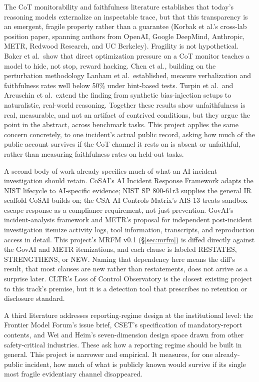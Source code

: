 \documentclass[10pt]{article}
\begin{document}
The CoT monitorability and faithfulness literature establishes that today's
reasoning models externalize an inspectable trace, but that this
transparency is an emergent, fragile property rather than a guarantee
(Korbak et al.'s cross-lab position paper, spanning authors from OpenAI,
Google DeepMind, Anthropic, METR, Redwood Research, and UC Berkeley).
Fragility is not hypothetical. Baker et al.\ show that direct optimization
pressure on a CoT monitor teaches a model to hide, not stop, reward hacking.
Chen et al., building on the perturbation methodology Lanham et al.\
established, measure verbalization and faithfulness rates well below 50\%
under hint-based tests. Turpin et al.\ and Arcuschin et al.\ extend the
finding from synthetic bias-injection setups to naturalistic, real-world
reasoning. Together these results show unfaithfulness is real, measurable,
and not an artifact of contrived conditions, but they argue the point in
the abstract, across benchmark tasks. This project applies the same concern
concretely, to one incident's actual public record, asking how much of the
public account survives if the CoT channel it rests on is absent or
unfaithful, rather than measuring faithfulness rates on held-out tasks.

A second body of work already specifies much of what an AI incident
investigation should retain. CoSAI's AI Incident Response Framework adapts
the NIST lifecycle to AI-specific evidence; NIST SP 800-61r3 supplies the
general IR scaffold CoSAI builds on; the CSA AI Controls Matrix's AIS-13
treats sandbox-escape response as a compliance requirement, not just
prevention. GovAI's incident-analysis framework and METR's proposal for
independent post-incident investigation itemize activity logs, tool
information, transcripts, and reproduction access in detail. This project's
MRFM v0.1 (\S\ref{sec:mrfm}) is diffed directly against the GovAI and METR
itemizations, and each clause is labeled RESTATES, STRENGTHENS, or NEW.
Naming that dependency here means the diff's result, that most clauses are
new rather than restatements, does not arrive as a surprise later. CLTR's
Loss of Control Observatory is the closest existing project to this track's
premise, but it is a detection tool that prescribes no retention or
disclosure standard.

A third literature addresses reporting-regime design at the institutional
level: the Frontier Model Forum's issue brief, CSET's specification of
mandatory-report contents, and Wei and Heim's seven-dimension design space
drawn from other safety-critical industries. These ask how a reporting
regime should be built in general. This project is narrower and empirical.
It measures, for one already-public incident, how much of what is publicly
known would survive if its single most fragile evidentiary channel
disappeared.
\end{document}
